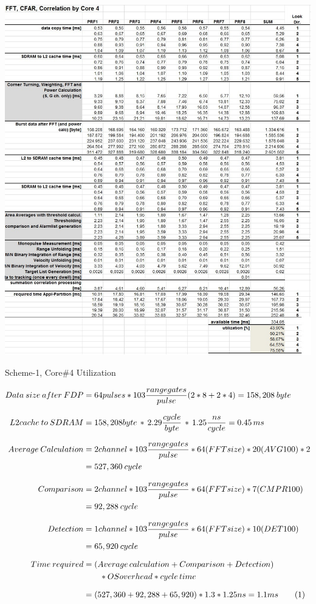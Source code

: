 \begin{table}[h!]
	\centering
	\includegraphics[width=150mm]{figures/aa_scheme1_cpu_util_4}
	\caption{Scheme-1, Core\#4 Utilization}
	\label{fig:existing_analysis:aa_scheme1_cpu_util4}
\end{table}

\begin{align*}
	\label{aa:scheme1:core4:equ2}
		Data \: size \: after \: FDP &=  64pulses * 103 \frac{range gates}{pulse} ( 2 * 8 + 2 * 4) = 158,208 \: byte\\[0.25cm] 
		L2cache \: to \: SDRAM &= 158,208 byte \, * \, 2.29\frac{cycle}{byte} \, * \, 1.25\frac{ns}{cycle} = 0.45 \, ms \\[0.25cm]
		Average \: Calculation &= 2channel * 103 \frac{range gates}{pulse} * 64(FFTsize) * 20(AVG100) * 2 \\
		&=  527,360 \: cycle \\[0.25cm]
		Comparison &= 2channel * 103 \frac{range gates}{pulse} * 64(FFTsize) * 7(CMPR100) \\
		&= 92,288 \: cycle \\[0.25cm]
		Detection &= 1channel * 103 \frac{range gates}{pulse} * 64(FFTsize) * 10(DET100) \\
		&= 65,920 \: cycle \\[0.25cm]
		Time \: required &= (Average \, calculation + Comparison + Detection) \\
		& \qquad * OSoverhead * cycle \, time \\[0.25cm]
		&= (527,360 + 92,288 + 65,920) * 1.3 * 1.25ns = 1.1ms \stepcounter{equation}\tag{\theequation} 
\end{align*}

